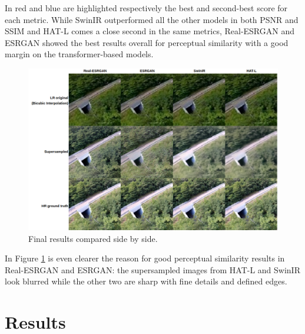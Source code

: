 In red and blue are highlighted respectively the best and second-best score for each metric. While SwinIR outperformed all the other models in both PSNR and SSIM and HAT-L comes a close second in the same metrics, Real-ESRGAN and ESRGAN showed the best results overall for perceptual similarity with a good margin on the transformer-based models.


\begin{figure}[H]

  \includegraphics[scale=0.4]{figures/results/comp_table.png}
  \caption{Final results compared side by side.}
  \label{img:comp_table}
\end{figure}

In Figure \ref{img:comp_table} is even clearer the reason for good perceptual similarity results in Real-ESRGAN and ESRGAN: the supersampled images from HAT-L and SwinIR look blurred while the other two are sharp with fine details and defined edges.


\chapter{Results}
\label{cha:Results}
